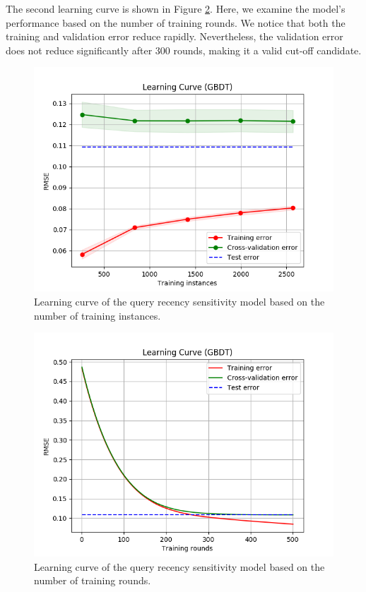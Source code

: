The second learning curve is shown in Figure \ref{fig:query-curve2}. Here, we examine the model's performance based on the number of training rounds. We notice that both the training and validation error reduce rapidly. Nevertheless, the validation error does not reduce significantly after 300 rounds, making it a valid cut-off candidate.

\begin{figure}[h]
\centering
\includegraphics[width=0.8\linewidth]{img/query_learning_curve.png}
\caption{Learning curve of the query recency sensitivity model based on the number of training instances.}
\label{fig:query-curve1}
\end{figure}

\begin{figure}[h]
\centering
\includegraphics[width=0.8\linewidth]{img/query_learning_curve2.png}
\caption{Learning curve of the query recency sensitivity model based on the number of training rounds.}
\label{fig:query-curve2}
\end{figure}
